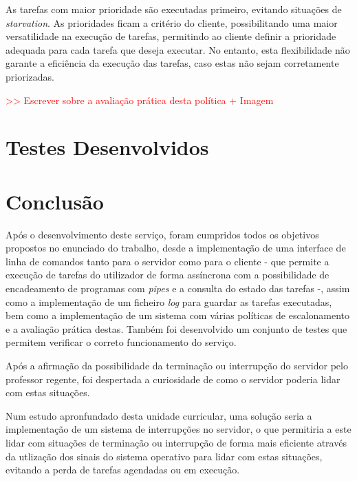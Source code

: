 \documentclass[a4paper,11pt]{scrreprt}
\begin{document}
        As tarefas com maior prioridade são executadas primeiro, evitando
        situações de \textit{starvation}. As prioridades ficam a critério do cliente,
        possibilitando uma maior versatilidade na execução de tarefas, permitindo ao cliente
        definir a prioridade adequada para cada tarefa que deseja executar. No entanto, esta
        flexibilidade não garante a eficiência da execução das tarefas, caso estas não sejam
        corretamente priorizadas.

        \textcolor{red}{>> Escrever sobre a avaliação prática desta política + Imagem}

\chapter{Testes Desenvolvidos}


\chapter{Conclusão}
    Após o desenvolvimento deste serviço, foram cumpridos todos
    os objetivos propostos no enunciado do trabalho, desde a implementação de
    uma interface de linha de comandos tanto para o servidor como para o cliente -
    que permite a execução de tarefas do utilizador de forma assíncrona com a
    possibilidade de encadeamento de programas com \textit{pipes} e a
    consulta do estado das tarefas -, assim como a implementação de um ficheiro
    \textit{log} para guardar as tarefas executadas, bem como a implementação de um
    sistema com várias políticas de escalonamento e a avaliação prática destas.
    Também foi desenvolvido um conjunto de testes que permitem verificar o correto
    funcionamento do serviço.

    Após a afirmação da possibilidade da terminação ou interrupção do servidor
    pelo professor regente, foi despertada a curiosidade de como o servidor
    poderia lidar com estas situações.

    Num estudo apronfundado desta unidade curricular, uma solução seria a
    implementação de um sistema de interrupções no servidor, o que permitiria
    a este lidar com situações de terminação ou interrupção de forma mais
    eficiente através da utlização dos sinais do sistema operativo para lidar com estas
    situações, evitando a perda de tarefas agendadas ou em execução.
\end{document}
